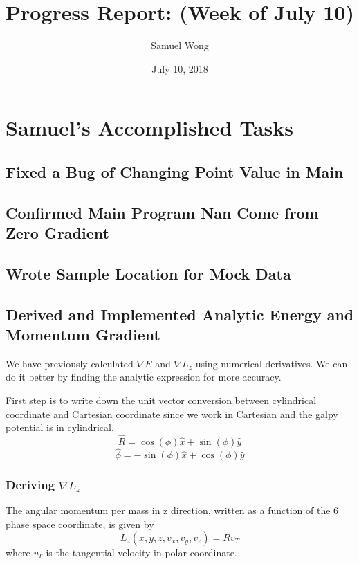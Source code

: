 \documentclass[12pt]{article}
\begin{document}
\title{Progress Report: (Week of July 10)}
\author{Samuel Wong}
\date{July 10, 2018}
\maketitle


\section{Samuel's Accomplished Tasks}
\subsection{Fixed a Bug of Changing Point Value in Main}

\subsection{Confirmed Main Program Nan Come from Zero Gradient}

\subsection{Wrote Sample Location for Mock Data}

\subsection{Derived and Implemented Analytic Energy and Momentum Gradient}
We have previously calculated $\nabla E$ and $\nabla L_z$ using numerical derivatives. We can do it better by finding the analytic expression for more accuracy.

First step is to write down the unit vector conversion between cylindrical coordinate and Cartesian coordinate since we work in Cartesian and the galpy potential is in cylindrical.
$$ \hat{R} = \cos(\phi) \hat{x} + \sin(\phi) \hat{y} $$
$$ \hat{\phi} = - \sin(\phi) \hat{x} + \cos(\phi) \hat{y} $$

\subsubsection{Deriving $\nabla L_z$}
The angular momentum per mass in z direction, written as a function of the 6 phase space coordinate, is given by
$$ L_z(x,y,z,v_x,v_y,v_z) = Rv_T $$
where $v_T$ is the tangential velocity in polar coordinate.
\end{document}
